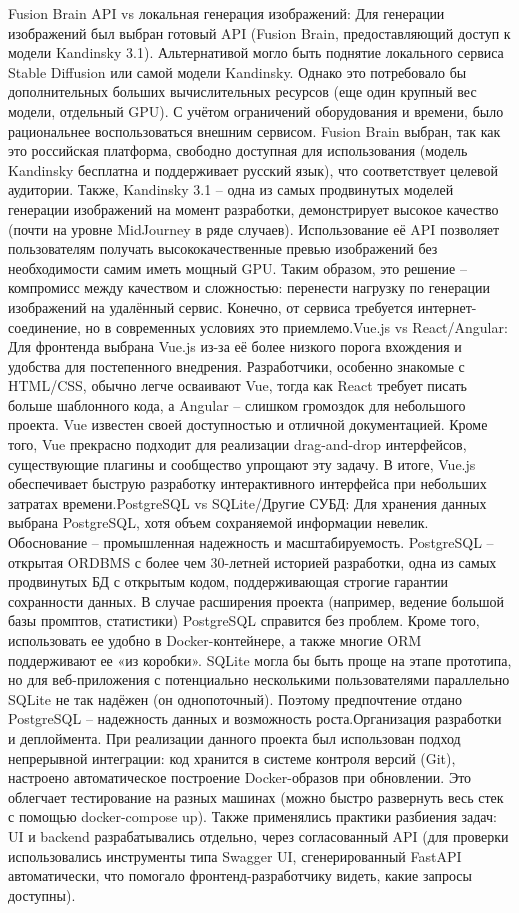 Fusion Brain API vs локальная генерация изображений: Для генерации изображений был выбран готовый API (Fusion Brain, предоставляющий доступ к модели Kandinsky 3.1)\cite{sitelabs:kandinsky}. Альтернативой могло быть поднятие локального сервиса Stable Diffusion или самой модели Kandinsky. Однако это потребовало бы дополнительных больших вычислительных ресурсов (еще один крупный вес модели, отдельный GPU). С учётом ограничений оборудования и времени, было рациональнее воспользоваться внешним сервисом. Fusion Brain выбран, так как это российская платформа, свободно доступная для использования (модель Kandinsky бесплатна и поддерживает русский язык\cite{sitelabs:kandinsky}), что соответствует целевой аудитории. Также, Kandinsky 3.1 – одна из самых продвинутых моделей генерации изображений на момент разработки, демонстрирует высокое качество (почти на уровне MidJourney в ряде случаев). Использование её API позволяет пользователям получать высококачественные превью изображений без необходимости самим иметь мощный GPU. Таким образом, это решение – компромисс между качеством и сложностью: перенести нагрузку по генерации изображений на удалённый сервис. Конечно, от сервиса требуется интернет-соединение, но в современных условиях это приемлемо.Vue.js vs React/Angular: Для фронтенда выбрана Vue.js из-за её более низкого порога вхождения и удобства для постепенного внедрения. Разработчики, особенно знакомые с HTML/CSS, обычно легче осваивают Vue, тогда как React требует писать больше шаблонного кода, а Angular – слишком громоздок для небольшого проекта. Vue известен своей доступностью и отличной документацией\cite{vuejs:wiki}. Кроме того, Vue прекрасно подходит для реализации drag-and-drop интерфейсов, существующие плагины и сообщество упрощают эту задачу. В итоге, Vue.js обеспечивает быструю разработку интерактивного интерфейса при небольших затратах времени.PostgreSQL vs SQLite/Другие СУБД: Для хранения данных выбрана PostgreSQL, хотя объем сохраняемой информации невелик. Обоснование – промышленная надежность и масштабируемость. PostgreSQL – открытая ORDBMS с более чем 30-летней историей разработки, одна из самых продвинутых БД с открытым кодом\cite{postgresql:skillfactory}, поддерживающая строгие гарантии сохранности данных. В случае расширения проекта (например, ведение большой базы промптов, статистики) PostgreSQL справится без проблем. Кроме того, использовать ее удобно в Docker-контейнере, а также многие ORM поддерживают ее «из коробки». SQLite могла бы быть проще на этапе прототипа, но для веб-приложения с потенциально несколькими пользователями параллельно SQLite не так надёжен (он однопоточный). Поэтому предпочтение отдано PostgreSQL – надежность данных и возможность роста.Организация разработки и деплоймента. При реализации данного проекта был использован подход непрерывной интеграции: код хранится в системе контроля версий (Git), настроено автоматическое построение Docker-образов при обновлении. Это облегчает тестирование на разных машинах (можно быстро развернуть весь стек с помощью docker-compose up). Также применялись практики разбиения задач: UI и backend разрабатывались отдельно, через согласованный API (для проверки использовались инструменты типа Swagger UI, сгенерированный FastAPI автоматически, что помогало фронтенд-разработчику видеть, какие запросы доступны).

